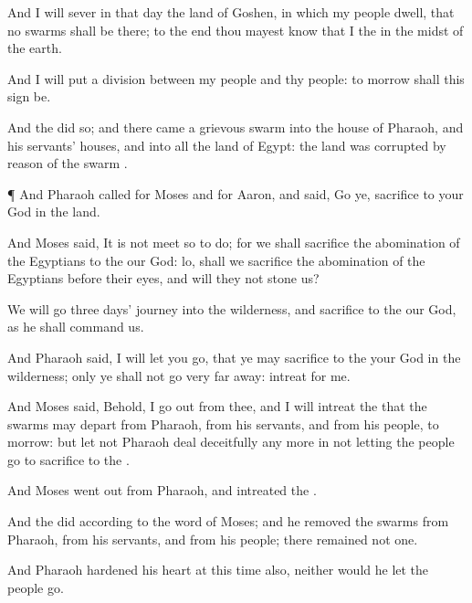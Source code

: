 {And I will
sever in that
day the
land of
Goshen, in which my
people
dwell, that
no
swarms
{} shall
be there; to the
end thou mayest
know that I
{} the
{} in the
midst of the
earth.

And I will
put a
division between my
people and thy
people: to
morrow shall this
sign be.

And the
{}
did so; and there
came a
grievous
swarm
{} into the
house of
Pharaoh, and
{} his
servants’
houses, and into all the
land of
Egypt: the
land was
corrupted by
reason of the
swarm
{}.


\par }{\PP {}¶ And
Pharaoh
called
for
Moses and for
Aaron, and
said,
Go ye,
sacrifice to your
God in the
land.

And
Moses
said, It is not
meet so to
do;
for we shall
sacrifice the
abomination of the
Egyptians to the
{} our
God: lo, shall we
sacrifice the
abomination of the
Egyptians before their
eyes, and will they not
stone us?

We will
go
three
days’
journey into the
wilderness, and
sacrifice to the
{} our
God, as he shall
command us.

And
Pharaoh
said, I will let you
go, that ye may
sacrifice to the
{} your
God in the
wilderness; only ye shall not
go
very far
away:
intreat for
me.

And
Moses
said, Behold, I go
out from thee, and I will
intreat the
{} that the
swarms
{} may
depart from
Pharaoh, from his
servants, and from his
people, to
morrow:
but let not
Pharaoh deal
deceitfully any
more in
not letting the
people
go to
sacrifice to the
{}.

And
Moses went
out from
Pharaoh, and
intreated the
{}.

And the
{}
did according to the
word of
Moses; and he
removed the
swarms
{} from
Pharaoh, from his
servants, and from his
people; there
remained not
one.

And
Pharaoh
hardened his
heart at this
time also, neither would he let the
people
go.




\par }
